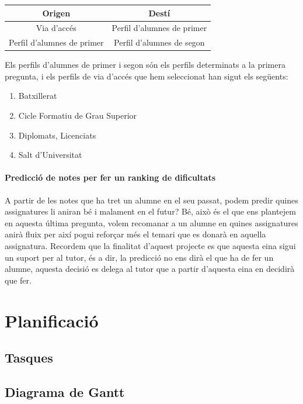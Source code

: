 \documentclass[11pt,a4paper,catalan]{article}
\begin{document}
\begin{table}[h]
\centering
\begin{tabular}{@{}cc@{}}
\toprule
{\bf Origen}               & {\bf Destí}                \\ \midrule
Via d'accés                & Perfil d'alumnes de primer \\
Perfil d'alumnes de primer & Perfil d'alumnes de segon  \\ \bottomrule
\end{tabular}
\end{table}
Els perfils d'alumnes de primer i segon són els perfils determinats a la primera pregunta, i els perfils de via d'accés que hem seleccionat han sigut els següents:
\begin{enumerate}
	\item Batxillerat
	\item Cicle Formatiu de Grau Superior
	\item Diplomats, Licenciats
	\item Salt d'Universitat
\end{enumerate}

\paragraph{Predicció de notes per fer un ranking de dificultats}
A partir de les notes que ha tret un alumne en el seu passat, podem predir quines assignatures li aniran bé i malament en el futur? Bé, això és el que ens plantejem en aquesta última pregunta, volem recomanar a un alumne en quines assignatures anirà fluix per així pogui reforçar més el temari que es donarà en aquella assignatura. Recordem que la finalitat d'aquest projecte es que aquesta eina sigui un suport per al tutor, és a dir, la predicció no ens dirà el que ha de fer un alumne, aquesta decisió es delega al tutor que a partir d'aquesta eina en decidirà que fer.
\newpage

\section{Planificació}
\subsection{Tasques}
\subsection{Diagrama de Gantt}
\end{document}
